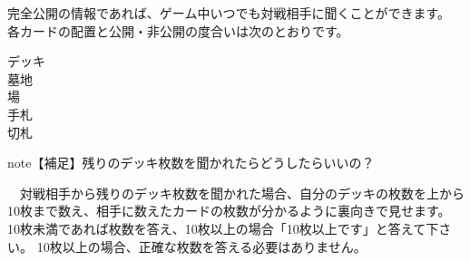 \documentclass[letterpaper,10pt,dvipdfmx]{sphinxmanual}
\begin{document}
完全公開の情報であれば、ゲーム中いつでも対戦相手に聞くことができます。
各カードの配置と公開・非公開の度合いは次のとおりです。
\begin{description}
\item[{デッキ}] \leavevmode
{}

\item[{墓地}] \leavevmode
{}

\item[{場}] \leavevmode
{}

\item[{手札}] \leavevmode
{}

\item[{切札}] \leavevmode
{}

\end{description}

\begin{sphinxadmonition}{note}{【補足】残りのデッキ枚数を聞かれたらどうしたらいいの？}

　対戦相手から残りのデッキ枚数を聞かれた場合、自分のデッキの枚数を上から10枚まで数え、相手に数えたカードの枚数が分かるように裏向きで見せます。
10枚未満であれば枚数を答え、10枚以上の場合「10枚以上です」と答えて下さい。
10枚以上の場合、正確な枚数を答える必要はありません。
\end{sphinxadmonition}
\end{document}
